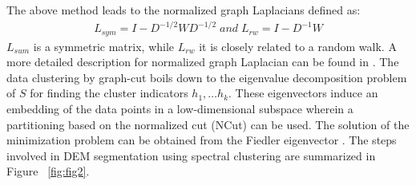 \documentclass[12pt,letterpaper]{article}
\begin{document}
The above method leads to the normalized graph Laplacians defined as:
\begin{align}
L_{sym} = I - D^{-1/2}WD^{-1/2} \; and \; L_{rw} = I - D^{-1} W
\end{align}
$L_{sum}$ is a symmetric matrix, while $L_{rw}$ it is closely related to a random walk. A more detailed 
description for normalized graph Laplacian can be found in \citet{Chung1997}.
The data clustering by graph-cut boils down to the eigenvalue decomposition problem of $S$ for finding 
the cluster indicators $h_1, \dots h_k$. %
These eigenvectors induce an embedding of the data points in a low-dimensional subspace wherein a
partitioning based on the normalized cut (NCut) can be used. The solution of the minimization problem can be 
obtained from the Fiedler eigenvector \citep{Stella2003}.
 The steps involved in DEM segmentation using spectral clustering are summarized in Figure ~\ref{fig:fig2}.
\end{document}
